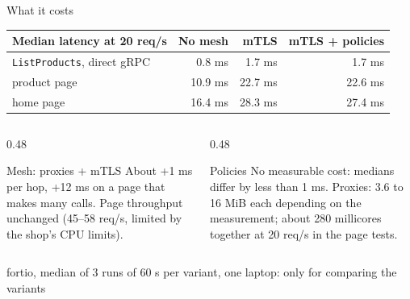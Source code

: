 \documentclass[9pt,aspectratio=169]{beamer}
\begin{document}
\begin{frame}{What it costs}
  \centering
  {\small
  \begin{tabular}{lrrr}
    \toprule
    \textbf{Median latency at 20 req/s} & \textbf{No mesh} & \textbf{mTLS} & \textbf{mTLS + policies} \\
    \midrule
    \texttt{ListProducts}, direct gRPC & 0.8 ms  & 1.7 ms  & 1.7 ms \\
    product page                       & 10.9 ms & 22.7 ms & 22.6 ms \\
    home page                          & 16.4 ms & 28.3 ms & 27.4 ms \\
    \bottomrule
  \end{tabular}}

  \vspace{10pt}
  \begin{columns}[T,onlytextwidth]
    \begin{column}{0.48\textwidth}
      \begin{block}{Mesh: proxies + mTLS}
        About +1 ms per hop, +12 ms on a page that makes many calls. Page
        throughput unchanged (45--58 req/s, limited by the shop's CPU limits).
      \end{block}
    \end{column}
    \begin{column}{0.48\textwidth}
      \begin{exampleblock}{Policies}
        No measurable cost: medians differ by less than 1 ms. Proxies: 3.6 to
        16 MiB each depending on the measurement; about 280 millicores together
        at 20 req/s in the page tests.
      \end{exampleblock}
    \end{column}
  \end{columns}

  \vspace{4pt}
  {\tiny fortio, median of 3 runs of 60 s per variant, one laptop: only for comparing the variants}
\end{frame}
\end{document}
